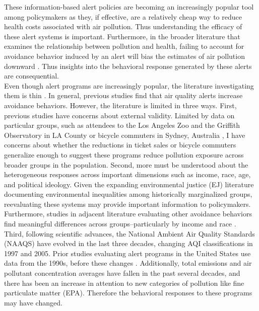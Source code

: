 \documentclass[12pt]{article}
\begin{document}
These information-based alert policies are becoming an increasingly popular tool among policymakers as they, if effective, are a relatively cheap way to reduce health costs associated with air pollution. Thus understanding the efficacy of these alert systems is important. Furthermore, in the broader literature that examines the relationship between pollution and health, failing to account for avoidance behavior induced by an alert will bias the estimates of air pollution downward \citep{neidell2004air}. Thus insights into the behavioral response generated by these alerts are consequential. \\

Even though alert programs are increasingly popular, the literature investigating them is thin \citep{zivin2009days, saberian2017alerts}. In general, previous studies find that air quality alerts increase avoidance behaviors. However, the literature is limited in three ways. First, previous studies have concerns about external validity. Limited by data on particular groups, such as attendees to the Los Angeles Zoo and the Griffith Observatory in LA County \citep{zivin2009days} or bicycle commuters in Sydney, Australia \citep{saberian2017alerts}, I have concerns about whether the reductions in ticket sales or bicycle commuters generalize enough to suggest these programs reduce pollution exposure across broader groups in the population. Second, more must be understood about the heterogeneous responses across important dimensions such as income, race, age, and political ideology. Given the expanding environmental justice (EJ) literature documenting environmental inequalities among historically marginalized groups, reevaluating these systems may provide important information to policymakers. Furthermore, studies in adjacent literature evaluating other avoidance behaviors find meaningful differences across groups--particularly by income and race \citep{burke2022exposures, holloway2022unequal}. Third, following scientific advances, the National Ambient Air Quality Standards (NAAQS) have evolved in the last three decades, changing AQI classifications in 1997 and 2005. Prior studies evaluating alert programs in the United States use data from the 1990s, before these changes \citep{zivin2009days}. Additionally, total emissions and air pollutant concentration averages have fallen in the past several decades, and there has been an increase in attention to new categories of pollution like fine particulate matter (EPA). Therefore the behavioral responses to these programs may have changed. \\
\end{document}
